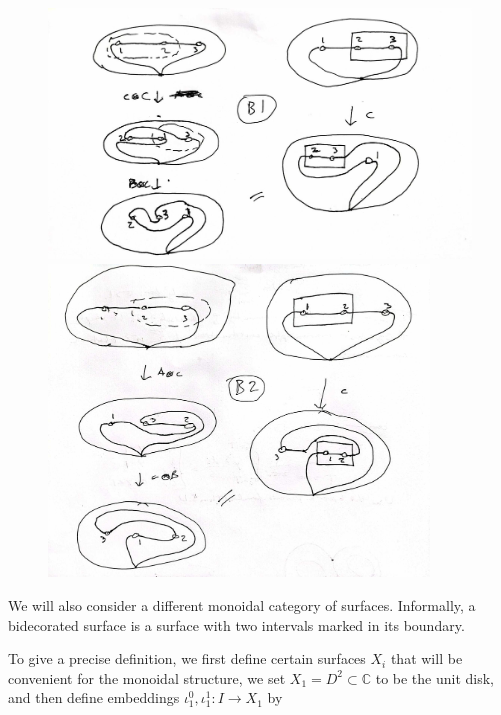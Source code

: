 \documentclass[reqno]{amsart}
\theoremstyle{definition}
\theoremstyle{remark}
\begin{document}
   \begin{figure}[H]
    \centering
    \begin{minipage}[b]{0.7\textwidth}
        \centering
        \includegraphics[width=1.1\textwidth]{B1.jpg} %
    \end{minipage}\hfill
    \begin{minipage}[b]{0.7\textwidth}
        \centering
        \includegraphics[width=0.9\textwidth]{B2.jpg} %
    \end{minipage}
\end{figure}

We will also consider a different monoidal category of
surfaces. Informally, a bidecorated surface is a surface with two 
intervals marked in its boundary.


    To give a precise definition, we first
    define certain surfaces $X_i$ that will be convenient for
    the monoidal structure, we set
    $X_1 = D^2 \subset \mathbb{C}$ to be the unit disk,
    and then define embeddings
    $\iota_1^{0}, \iota_1^{1} \colon I \to X_1$ by
\end{document}
